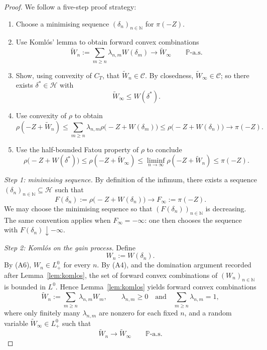 \documentclass[11pt,a4paper]{report}
\numberwithin{equation}{chapter}
\theoremstyle{plain}
\theoremstyle{definition}
\newcommand{\PP}{\mathbb{P}}
\newcommand{\N}{\mathbb{N}}
\newcommand{\HH}{\mathcal{H}}
\newcommand{\CC}{\mathcal{C}}
\begin{document}
\begin{proof}
    We follow a five-step proof strategy:
    \begin{enumerate}[leftmargin=*,itemsep=0pt,parsep=0pt]
        \item Choose a minimising sequence $(\delta_n)_{n\in\N}$ for $\pi(-Z)$.
        \item Use Koml\'os' lemma to obtain forward convex combinations
              \[
                  \widetilde W_n:=\sum_{m\ge n}\lambda_{n,m}W(\delta_m)\longrightarrow\widetilde W_\infty\qquad\PP\text{-a.s.}
              \]
        \item Show, using convexity of $C_T$, that $\widetilde W_n\in\CC$. By closedness, $\widetilde W_\infty\in\CC$; so there exists $\delta^*\in\HH$ with
              \[
                  \widetilde W_\infty\le W(\delta^*).
              \]
        \item Use convexity of $\rho$ to obtain
              \[
                  \rho(-Z+\widetilde W_n)\le\sum_{m\ge n}\lambda_{n,m}\rho\bigl(-Z+W(\delta_m)\bigr)\le\rho\bigl(-Z+W(\delta_n)\bigr)\longrightarrow\pi(-Z).
              \]
        \item Use the half-bounded Fatou property of $\rho$ to conclude
              \[
                  \rho\bigl(-Z+W(\delta^*)\bigr)\le\rho(-Z+\widetilde W_\infty)\le\liminf_{n\to\infty}\rho(-Z+\widetilde W_n)\le\pi(-Z).
              \]
    \end{enumerate}

    \emph{Step 1: minimising sequence.}
    By definition of the infimum, there exists a sequence $(\delta_n)_{n\in\N}\subseteq\HH$ such that
    \[
        F(\delta_n):=\rho\bigl(-Z+W(\delta_n)\bigr)\longrightarrow F_\infty:=\pi(-Z).
    \]
    We may choose the minimising sequence so that $(F(\delta_n))_{n\in\N}$ is decreasing. The same convention applies when $F_\infty=-\infty$: one then chooses the sequence with $F(\delta_n)\downarrow-\infty$.

    \emph{Step 2: Koml\'os on the gain process.}
    Define
    \[
        W_n:=W(\delta_n).
    \]
    By (A6), $W_n\in L^0_+$ for every $n$. By (A4), and the domination argument recorded after Lemma~\ref{lem:komlos}, the set of forward convex combinations of $(W_n)_{n\in\N}$ is bounded in $L^0$. Hence Lemma~\ref{lem:komlos} yields forward convex combinations
    \[
        \widetilde W_n:=\sum_{m\ge n}\lambda_{n,m}W_m,\qquad\lambda_{n,m}\ge0 \quad\text{and}\quad\sum_{m\ge n}\lambda_{n,m}=1,
    \]
    where only finitely many $\lambda_{n,m}$ are nonzero for each fixed $n$, and a random variable $\widetilde W_\infty\in L^0_+$ such that
    \begin{equation}\label{eq:komlos-limit}
        \widetilde W_n\to\widetilde W_\infty\qquad\PP\text{-a.s.}
    \end{equation}


\end{proof}
\end{document}
